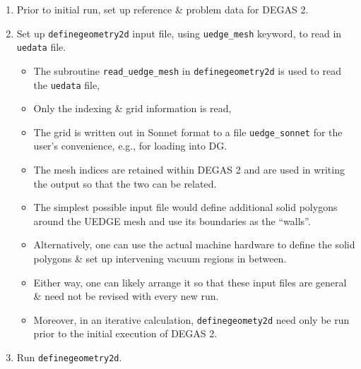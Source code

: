 \documentclass[11pt]{article}
\begin{document}
\begin{enumerate}
\begin{itemize}
\begin{itemize}
\begin{itemize}
      \end{itemize}
      \item $R$ velocity along inner target, looped over ion species.
      \item $Z$ velocity along inner target, looped over ion species.
      \item $\phi$ velocity along inner target, looped over ion species.
      \item Common ion temperature along inner target.
      \item Electron temperature along inner target.
      \item Ion current to inner target, looped over ion species.
      \item Same list of quantities for outer target.
    \end{itemize}
  \end{itemize}
  \item Prior to initial run, set up reference \& problem data for DEGAS 2.
  \item Set up {\tt definegeometry2d} input file, using {\tt uedge\_mesh} keyword, to read in {\tt uedata} file.
  \begin{itemize}
    \item The subroutine \verb+read_uedge_mesh+ in {\tt definegeometry2d} is used to read the {\tt uedata} file,
    \item Only the indexing \& grid information is read,
    \item The grid is written out in Sonnet format to a file \verb+uedge_sonnet+ for the user's convenience, e.g., for loading into DG.
    \item The mesh indices are retained within DEGAS 2 and are used in writing the output so that the two can be related.
    \item The simplest possible input file would define additional solid polygons around the UEDGE mesh and use its boundaries as the ``walls''.
    \item Alternatively, one can use the actual machine hardware to define the solid polygons \& set up intervening vacuum regions in between.
    \item Either way, one can likely arrange it so that these input files are general \& need not be revised with every new run.
    \item Moreover, in an iterative calculation, {\tt definegeomety2d} need only be run prior to the initial execution of DEGAS 2.
  \end{itemize}
  \item Run {\tt definegeometry2d}.

\end{enumerate}
\end{document}

